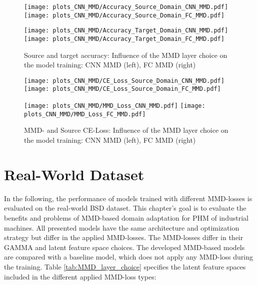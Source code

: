 \begin{figure}[htp]
  \centering
  \texttt{[image: plots\_CNN\_MMD/Accuracy\_Source\_Domain\_CNN\_MMD.pdf]}
  \hspace{.3cm}
  \texttt{[image: plots\_CNN\_MMD/Accuracy\_Source\_Domain\_FC\_MMD.pdf]}

  \vspace{.1cm}

  \texttt{[image: plots\_CNN\_MMD/Accuracy\_Target\_Domain\_CNN\_MMD.pdf]}
  \hspace{.3cm}
  \texttt{[image: plots\_CNN\_MMD/Accuracy\_Target\_Domain\_FC\_MMD.pdf]}

  \caption{Source and target accuracy: Influence of the MMD layer choice on the model training: CNN MMD (left), FC MMD (right)}
  \label{fig:accuracy_cnn_and_no_cnn_mmd}
\end{figure}

\begin{figure}[H]
  \centering
  \texttt{[image: plots\_CNN\_MMD/CE\_Loss\_Source\_Domain\_CNN\_MMD.pdf]}
  \hspace{.3cm}
  \texttt{[image: plots\_CNN\_MMD/CE\_Loss\_Source\_Domain\_FC\_MMD.pdf]}

  \vspace{.1cm}

  \texttt{[image: plots\_CNN\_MMD/MMD\_Loss\_CNN\_MMD.pdf]}
  \hspace{.1cm}
  \texttt{[image: plots\_CNN\_MMD/MMD\_Loss\_FC\_MMD.pdf]}

  \caption{MMD- and Source CE-Loss: Influence of the MMD layer choice on the model training: CNN MMD (left), FC MMD (right)}
  \label{fig:loss_cnn_and_no_cnn_mmd}
\end{figure}

\section{Real-World Dataset}\label{sec:results_real_world_dataset}
In the following, the performance of models trained with different MMD-losses is evaluated on the real-world BSD dataset. This chapter's goal is to evaluate the benefits and problems of MMD-based domain adaptation for PHM of industrial machines. All presented models have the same architecture and optimization strategy but differ in the applied MMD-losses. The MMD-losses differ in their GAMMA and latent feature space choices. The developed MMD-based models are compared with a baseline model, which does not apply any MMD-loss during the training. Table \ref{tab:MMD_layer_choice}  specifies the latent feature spaces included in the different applied MMD-loss types:


